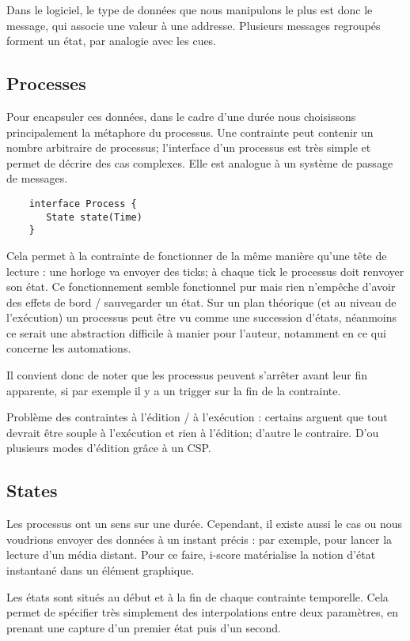 \documentclass{sigchi}
\begin{document}
Dans le logiciel, le type de données que nous manipulons le plus est donc le message, qui associe une valeur à une addresse. Plusieurs messages regroupés forment un état, par analogie avec les cues.

\subsection{Processes}
Pour encapsuler ces données, dans le cadre d'une durée nous choisissons principalement la métaphore du processus. Une contrainte peut contenir un nombre arbitraire de processus; l'interface d'un processus est très simple et permet de décrire des cas complexes. Elle est analogue à un système de passage de messages.

\begin{lstlisting}
    interface Process {
       State state(Time)
    }
\end{lstlisting}

Cela permet à la contrainte de fonctionner de la même manière qu'une tête de lecture : une horloge va envoyer des ticks; à chaque tick le processus doit renvoyer son état. Ce fonctionnement semble fonctionnel pur mais rien n'empêche d'avoir des effets de bord / sauvegarder un état.
Sur un plan théorique (et au niveau de l'exécution) un processus peut être vu comme une succession d'états, néanmoins ce serait une abstraction difficile à manier pour l'auteur, notamment en ce qui concerne les automations.

Il convient donc de noter que les processus peuvent s'arrêter avant leur fin apparente, si par exemple il y a un trigger sur la fin de la contrainte.

Problème des contraintes à l'édition / à l'exécution : certains arguent que tout devrait être souple à l'exécution et rien à l'édition; d'autre le contraire. D'ou plusieurs modes d'édition grâce à un CSP.

\subsection{States}
Les processus ont un sens sur une durée. Cependant, il existe aussi le cas ou nous voudrions envoyer des données à un instant précis : par exemple, pour lancer la lecture d'un média distant.
Pour ce faire, i-score matérialise la notion d'état instantané dans un élément graphique.

Les états sont situés au début et à la fin de chaque contrainte temporelle. Cela permet de spécifier très simplement des interpolations entre deux paramètres, en prenant une capture d'un premier état puis d'un second.
\end{document}
